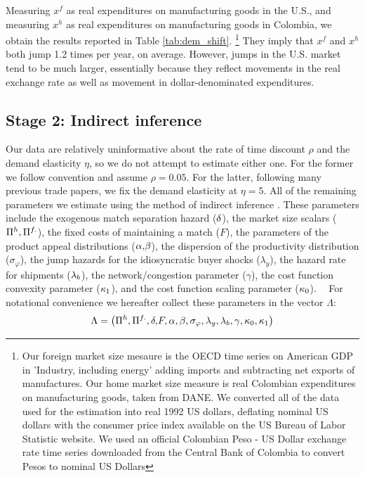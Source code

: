 Measuring $x^{f}$ as real expenditures on manufacturing goods in the U.S.,
and measuring $x^{h}$ as real expenditures on manufacturing goods in
Colombia, we obtain the results reported in Table \ref{tab:dem_shift}.%
\footnote{%
Our foreign market size mesaure is the OECD time series on American GDP in 'Industry, including
energy' adding imports and subtracting net exports of manufactures. Our home market size measure
is real Colombian expenditures on manufacturing goods, taken from DANE. 
We converted all of the data used for the estimation into real 1992 US
dollars, deflating nominal US dollars with the consumer price index available on
 the US Bureau of Labor Statistic website. We used an
official Colombian Peso - US Dollar exchange rate time series downloaded
from the Central Bank of Colombia to convert Pesos to nominal US Dollars} They imply that $x^{f}$ and $x^{h}$ both jump 1.2 times per year, on
average. However, jumps in the U.S. market tend to be much larger,
essentially because they reflect movements in the real exchange rate as well
as movement in dollar-denominated expenditures.

\subsection{Stage 2: Indirect inference}

Our data are relatively uninformative about the rate of time discount $\rho $
and the demand elasticity $\eta $, so we do not attempt to estimate either
one$.$ For the former we follow convention and assume $\rho =0.05$. For the
latter, following many previous trade papers, we fix the demand elasticity
at $\eta =5.$ All of the remaining parameters we estimate using the method
of indirect inference \citep{gourieroux1997simulation}. These parameters
include the exogenous match separation hazard (${\small \delta }$), the
market size scalars (${\small \Pi }^{h},{\small \Pi }^{f.}$), the fixed
costs of maintaining a match ($F$), the parameters of the product appeal
distributions (${\small \alpha }{\small ,}{\small \beta }$), the dispersion
of the productivity distribution ($\sigma _{\varphi }$), the jump hazards
for the idiosyncratic buyer shocks ($\lambda _{y}$), the hazard rate for
shipments (${\small \lambda }_{b}$), the network/congestion parameter ($%
\gamma $), the cost function convexity parameter (${\small \kappa _{1}}$),
and the cost function scaling parameter (${\small \kappa _{0}}$). \textbf{\ }%
For notational convenience we hereafter collect these parameters in the
vector $\Lambda :$%
\begin{equation*}
\Lambda =\left( {\small \Pi }^{h},{\small \Pi }^{f.},{\small \delta ,}F,%
{\small \alpha },{\small \beta },\sigma _{\varphi },\lambda _{y},{\small %
\lambda }_{b},{\small \gamma ,\kappa _{0},\kappa _{1}}\right)
\end{equation*}

